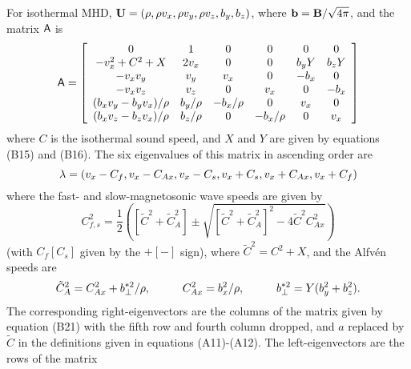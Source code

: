 For isothermal MHD, ${\bf U} = (\rho, \rho v_{x}, \rho v_{y},
\rho v_{z}, b_{y}, b_{z})$, where ${\bf b} = {\bf B}/\sqrt{4\pi}$,
and the matrix ${\sf A}$ is
\begin{equation}
{\sf A} = \left[ \begin{array}{cccccc}
0 & 1 & 0 & 0 & 0 & 0 \\
- v_{x}^2 + C^2 + X & 2 v_{x} & 0 & 0 & b_{y}Y & b_{z}Y  \\
- v_{x} v_{y} & v_{y} & v_{x} & 0 & -b_{x} & 0 \\
- v_{x} v_{z} & v_{z} & 0 & v_{x} & 0 & -b_{x} \\
(b_{x}v_{y} - b_{y}v_{x})/\rho & b_{y}/\rho & -b_{x}/\rho & 0 & v_{x} & 0 \\
(b_{x}v_{z} - b_{z}v_{x})/\rho & b_{z}/\rho & 0 & -b_{x}/\rho & 0 & v_{x}  
\end{array} \right]
\end{equation}
where $C$ is the isothermal sound speed, and $X$ and $Y$ are given by equations
(B15) and (B16).  The six eigenvalues of this matrix in ascending order are
\begin{equation}
{\bf \lambda} = (v_{x}-C_{f}, v_{x}-C_{Ax}, v_{x}-C_{s},
v_{x}+C_{s}, v_{x}+C_{Ax}, v_{x}+C_{f})
\end{equation}
where the fast- and slow-magnetosonic wave speeds are given by
\begin{equation}
C_{f,s}^2 = \frac{1}{2} \left( \left[\tilde{C}^{2}+\tilde{C}_{A}^{2}\right] \pm
\sqrt{\left[\tilde{C}^{2}+\tilde{C}_{A}^{2}\right]^{2} - 
4\tilde{C}^2 C_{Ax}^2}\right)
\end{equation}
(with $C_{f}[C_{s}]$ given by the $+[-]$ sign), where $\tilde{C}^{2} = C^{2}+X$,
and the Alfv\'{e}n speeds are 
\begin{equation}
\tilde{C}_{A}^{2} = C_{Ax}^{2} + b_{\perp}^{\ast 2}/\rho, \hspace*{1cm}
C_{Ax}^{2} = b_{x}^{2}/\rho, \hspace*{1cm}
b_{\perp}^{\ast 2} = Y(b_{y}^{2} + b_{z}^{2}).
\end{equation}
The corresponding right-eigenvectors are the columns of the matrix given by
equation (B21) with the fifth row and fourth column dropped, and $a$ replaced
by $\tilde{C}$ in the definitions given in equations (A11)-(A12).
The left-eigenvectors are the rows of the matrix
